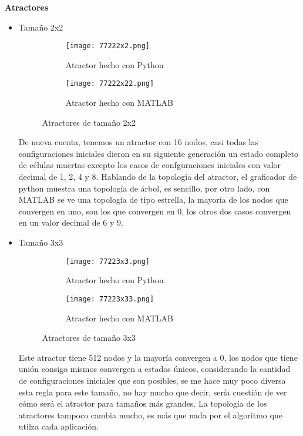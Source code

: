 \documentclass{article}
\begin{document}
 	  \textbf{Atractores}
 	  
 	 \begin{itemize}
 	 	
 	 	\item Tamaño 2x2
 	 	
 	 	\begin{figure}[htbp]
 	 		\centering
 	 		\begin{subfigure}{0.48\textwidth}
 	 			\centering
 	 			\texttt{[image: 77222x2.png]}
 	 			\caption{Atractor hecho con Python}
 	 			\label{fig:A1}
 	 		\end{subfigure}
 	 		\hfill
 	 		\begin{subfigure}{0.48\textwidth}
 	 			\centering
 	 			\texttt{[image: 77222x22.png]}
 	 			\caption{Atractor hecho con MATLAB}
 	 			\label{fig:A2}
 	 		\end{subfigure}
 	 		\caption{Atractores de tamaño 2x2}
 	 		\label{fig:conjuntoA}
 	 	\end{figure}
 	 	
 		De nueva cuenta, tenemos un atractor con 16 nodos, casi todas las configuraciones iniciales dieron en su siguiente generación un estado completo de células muertas excepto los casos de confguraciones iniciales con valor decimal de 1, 2, 4 y 8.
 	 	Hablando de la topología del atractor, el graficador de python muestra una topología de árbol, es sencillo, por otro lado, con MATLAB se ve una topología de tipo estrella, la mayoría de los nodos que convergen en uno, son los que convergen en 0, los otros dos casos convergen en un valor decimal de 6 y 9. 
 	 	
 	 	\item Tamaño 3x3
 	 	
 	 	\begin{figure}[htbp]
 	 		\centering
 	 		\begin{subfigure}{0.48\textwidth}
 	 			\centering
 	 			\texttt{[image: 77223x3.png]}
 	 			\caption{Atractor hecho con Python}
 	 			\label{fig:A1}
 	 		\end{subfigure}
 	 		\hfill
 	 		\begin{subfigure}{0.48\textwidth}
 	 			\centering
 	 			\texttt{[image: 77223x33.png]}
 	 			\caption{Atractor hecho con MATLAB}
 	 			\label{fig:A2}
 	 		\end{subfigure}
 	 		\caption{Atractores de tamaño 3x3}
 	 		\label{fig:conjuntoA}
 	 	\end{figure}
 	 	
 	 	Este atractor tiene 512 nodos y la mayoría convergen a 0, los nodos que tiene unión consigo mismos convergen a estados únicos, considerando la cantidad de configuraciones iniciales que son posibles, se me hace muy poco diversa esta regla para este tamaño, no hay mucho que decir, sería cuestión de ver cómo será el atractor para tamaños más grandes. La topología de los atractores tampoco cambia mucho, es más que nada por el algoritmo que utilza cada aplicación.
 	 	

\end{itemize}
\end{document}
